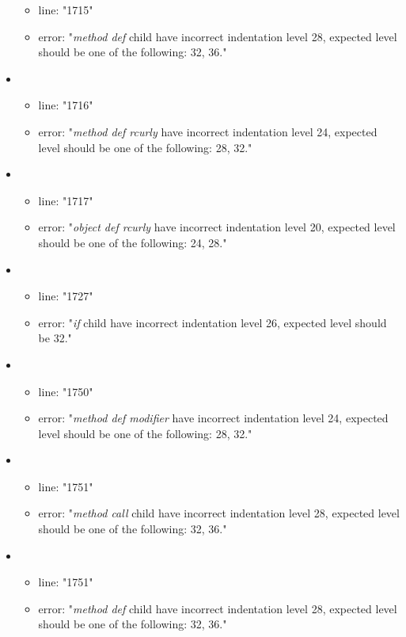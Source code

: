 \begin{itemize}
\begin{itemize}
		\item line: "1715" 
		\item error: "\emph{method def} child have incorrect indentation level 28, expected level should be one of the following: 32, 36." 
	\end{itemize}
	\item 
	\begin{itemize} 
		\item line: "1716" 
		\item error: "\emph{method def rcurly} have incorrect indentation level 24, expected level should be one of the following: 28, 32." 
	\end{itemize}
	\item 
	\begin{itemize} 
		\item line: "1717" 
		\item error: "\emph{object def rcurly} have incorrect indentation level 20, expected level should be one of the following: 24, 28." 
	\end{itemize}
	\item 
	\begin{itemize} 
		\item line: "1727" 
		\item error: "\emph{if} child have incorrect indentation level 26, expected level should be 32." 
	\end{itemize}
	\item 
	\begin{itemize} 
		\item line: "1750" 
		\item error: "\emph{method def modifier} have incorrect indentation level 24, expected level should be one of the following: 28, 32." 
	\end{itemize}
	\item 
	\begin{itemize} 
		\item line: "1751" 
		\item error: "\emph{method call} child have incorrect indentation level 28, expected level should be one of the following: 32, 36." 
	\end{itemize}
	\item 
	\begin{itemize} 
		\item line: "1751" 
		\item error: "\emph{method def} child have incorrect indentation level 28, expected level should be one of the following: 32, 36." 
	\end{itemize}

\end{itemize}
